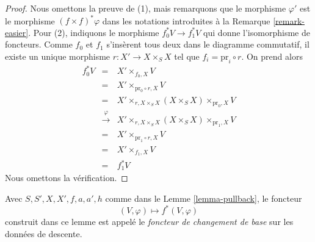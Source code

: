 \begin{proof}
Nous omettons la preuve de (1), mais remarquons que le morphisme $\varphi'$
est le morphisme $(f \times f)^*\varphi$ dans les notations introduites à la
Remarque \ref{remark-easier}. Pour (2), indiquons le morphisme
$f_0^*V \to f_1^*V$ qui donne l'isomorphisme de foncteurs. Comme $f_0$ et
$f_1$ s'insèrent tous deux dans le diagramme commutatif, il existe un unique
morphisme $r : X' \to X \times_S X$ tel que
$f_i = \text{pr}_i \circ r$. On prend alors
\begin{eqnarray*}
f_0^*V & = &
X' \times_{f_0, X} V \\
& = &
X' \times_{\text{pr}_0 \circ r, X} V \\
& = &
X' \times_{r, X \times_S X} (X \times_S X) \times_{\text{pr}_0, X} V \\
& \xrightarrow{\varphi} &
X' \times_{r, X \times_S X} (X \times_S X) \times_{\text{pr}_1, X} V \\
& = &
X' \times_{\text{pr}_1 \circ r, X} V \\
& = &
X' \times_{f_1, X} V \\
& = & f_1^*V
\end{eqnarray*}
Nous omettons la vérification.
\end{proof}

\begin{definition}
\label{definition-pullback-functor}
Avec $S, S', X, X', f, a, a', h$ comme dans le
Lemme \ref{lemma-pullback}, le foncteur
$$
(V, \varphi) \longmapsto f^*(V, \varphi)
$$
construit dans ce lemme est appelé le {\it foncteur de changement de base}
sur les données de descente.
\end{definition}

